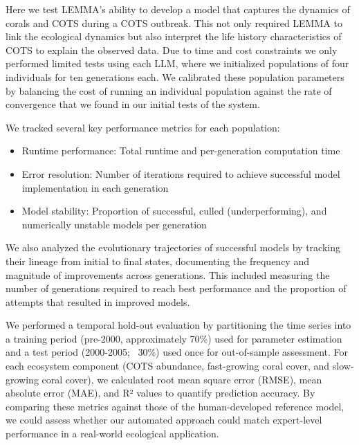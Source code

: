 Here we test LEMMA's ability to develop a model that captures the dynamics of corals and COTS during a COTS outbreak. This not only required LEMMA to link the ecological dynamics but also interpret the life history characteristics of COTS to explain the observed data. Due to time and cost constraints we only performed limited tests using each LLM, where we initialized populations of four individuals for ten generations each. We calibrated these population parameters by balancing the cost of running an individual population against the rate of convergence that we found in our initial tests of the system.

We tracked several key performance metrics for each population:
\begin{itemize}
    \item Runtime performance: Total runtime and per-generation computation time
    \item Error resolution: Number of iterations required to achieve successful model implementation in each generation
    \item Model stability: Proportion of successful, culled (underperforming), and numerically unstable models per generation
\end{itemize}

We also analyzed the evolutionary trajectories of successful models by tracking their lineage from initial to final states, documenting the frequency and magnitude of improvements across generations. This included measuring the number of generations required to reach best performance and the proportion of attempts that resulted in improved models.

We performed a temporal hold-out evaluation by partitioning the time series into a training period (pre-2000, approximately 70\%) used for parameter estimation and a test period (2000-2005; ~30\%) used once for out-of-sample assessment. For each ecosystem component (COTS abundance, fast-growing coral cover, and slow-growing coral cover), we calculated root mean square error (RMSE), mean absolute error (MAE), and R² values to quantify prediction accuracy. By comparing these metrics against those of the human-developed reference model, we could assess whether our automated approach could match expert-level performance in a real-world ecological application.
